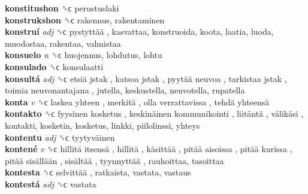 \textbf{konstitushon} ␝ϲ  perustuslaki  \\
\textbf{konstrukshon} ␝ϲ  rakennus, rakentaminen  \\
\textbf{konstruí} \emph{adj}  ␝ϲ   pystyttää , kasvattaa, konstruoida, koota, laatia, luoda, muodostaa, rakentaa, valmistaa  \\
\textbf{konsuelo} \emph{n}  ␝ϲ  huojennus, lohdutus, lohtu  \\
\textbf{konsulado} ␝ϲ  konsulaatti  \\
\textbf{konsultá} \emph{adj}  ␝ϲ   etsiä jstak ,  katsoa jstak ,  pyytää neuvoa ,  tarkistaa jstak ,  toimia neuvonantajana , jutella, keskustella, neuvotella, rupatella  \\
\textbf{konta} \emph{v}  ␝ϲ   laskea yhteen ,  merkitä ,  olla verrattavissa ,  tehdä yhteensä   \\
\textbf{kontakto} ␝ϲ   fyysinen kosketus ,  keskinäinen kommunikointi ,  liitäntä ,  välikäsi , kontakti, kosketin, kosketus, linkki, piilolinssi, yhteys  \\
\textbf{kontentu} \emph{adj}  ␝ϲ   tyytyväinen   \\
\textbf{kontené} \emph{v}  ␝ϲ   hillitä itsensä ,  hillitä ,  käsittää ,  pitää aisoissa ,  pitää kurissa ,  pitää sisällään ,  sisältää ,  tyynnyttää , rauhoittaa, tasoittaa  \\
\textbf{kontesta} ␝ϲ   selvittää , ratkaista, vastata, vastaus  \\
\textbf{kontestá} \emph{adj}  ␝ϲ  vastata  \\
